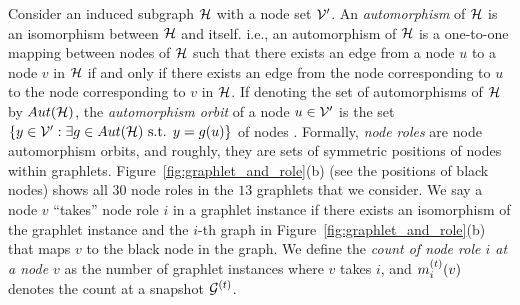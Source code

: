 

Consider an induced subgraph $\mathcal{H}$ with a node set $\mathcal{V}'$. 
An \textit{automorphism} of $\mathcal{H}$ is an isomorphism between $\mathcal{H}$ and itself. i.e., an automorphism of $\mathcal{H}$ is a one-to-one mapping between nodes of $\mathcal{H}$ such that there exists an edge from a node $u$ to a node $v$ in $\mathcal{H}$ if and only if there exists an edge from the node corresponding to $u$ to the node corresponding to $v$ in $\mathcal{H}$.  
If denoting the set of automorphisms of $\mathcal{H}$ by $Aut(\mathcal{H})$,
the \textit{automorphism orbit} of a node $u\in \mathcal{V}'$ is the set $\{y \in \mathcal{V}' : \exists g \in Aut(\mathcal{H}) \text{ s.t. } y = g(u)\}$ of nodes \cite{prvzulj2007biological}.
Formally, \textit{node roles} are node automorphism orbits, and roughly, they are sets of symmetric positions of nodes within graphlets.
Figure~\ref{fig:graphlet_and_role}(b) (see the positions of black nodes) shows all $30$ node roles in the $13$ graphlets that we consider.
We say a node $v$ ``takes'' node role $i$ in a graphlet instance if there exists an isomorphism of the graphlet instance and the $i$-th graph in Figure~\ref{fig:graphlet_and_role}(b) that maps $v$ to the black node in the graph.
We define the \textit{count of node role $i$ at a node $v$} as the number of graphlet instances where $v$ takes $i$, and $m^{(t)}_i(v)$ denotes the count at a snapshot $\mathcal{G}^{(t)}$.


